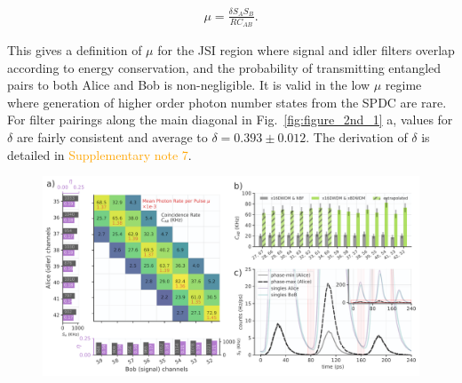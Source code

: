 \documentclass[11pt]{caltech_thesis} %
\begin{document}
$$
\begin{align}
\mu =  \frac{\delta S_A S_B}{R C_{AB}}.
\end{align}
$$

This gives a definition of $\mu$ for the JSI region where signal and idler filters overlap according to energy conservation, and the probability of transmitting entangled pairs to both Alice and Bob is non-negligible. It is valid in the low $\mu$ regime where generation of higher order photon number states from the SPDC are rare. For filter pairings along the main diagonal in Fig.~\ref{fig:figure_2nd_1} a, values for $\delta$ are fairly consistent and average to $\delta = 0.393 \pm 0.012$. The derivation of $\delta$ is detailed in \textcolor{orange}{Supplementary note 7}.

\hypertarget{fig:figure_2nd_1}{%
\begin{figure}
\centering
\includegraphics[width=1\textwidth,height=\textheight]{./chapter_05/figs/jsi_figure_light.pdf}

\end{figure}}
\end{document}
